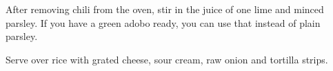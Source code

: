 \begin{recipe}
After removing chili from the oven, stir in the juice of one lime and minced parsley. If you have a green adobo ready, you can use that instead of plain parsley.


Serve over rice with grated cheese, sour cream, raw onion and tortilla strips.

\end{recipe}
